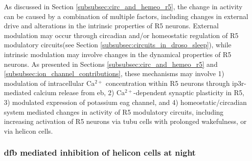 \documentclass[../main.tex]{subfiles}
\begin{document}
As discussed in Section \ref{subsubsec:circ_and_hemeo_r5}, the change in activity can be caused by a combination of multiple factors, including changes in external drive and alterations in the intrinsic properties of R5 neurons. External modulation may occur through circadian and/or homeostatic regulation of R5 modulatory circuits(see Section \ref{subsubsec:circuits_in_droso_sleep}), while intrinsic modulation may involve changes in the dynamical properties of R5 neurons. As presented in Sections \ref{subsubsec:circ_and_hemeo_r5} and \ref{subsubsec:ion_channel_contributions}, these mechanisms may involve 1) modulation of intracellular Ca$^{2+}$ concentration within R5 neurons through \gls{ip3r}-mediated calcium release from \gls{eb}, 2) Ca$^{2+}$-dependent synaptic plasticity in R5, 3) modulated expression of potassium \gls{eag} channel, and 4) homeostatic/circadian system mediated changes in activity of R5 modulatory circuits, including increasing activation of R5 neurons via \gls{tubu} cells with prolonged wakefulness, or via helicon cells.



\subsubsection{\texorpdfstring{\acrshort{dfb}}{dFB} mediated inhibition of helicon cells at night}
\end{document}
